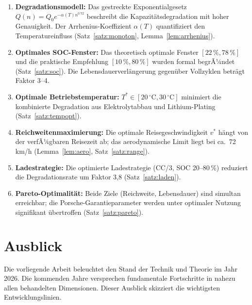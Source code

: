 ﻿\documentclass[a4paper,12pt]{article}
\theoremstyle{definition}
\begin{document}
\begin{enumerate}
  \item \textbf{Degradationsmodell:} Das gestreckte Exponentialgesetz
    $Q(n) = Q_0 e^{-\alpha(T) n^{0.72}}$ beschreibt die Kapazit\"atsdegradation
    mit hoher Genauigkeit. Der Arrhenius-Koeffizient $\alpha(T)$ quantifiziert
    den Temperatureinfluss (Satz~\ref{satz:monoton}, Lemma~\ref{lem:arrhenius}).

  \item \textbf{Optimales SOC-Fenster:} Das theoretisch optimale Fenster
    $[22\,\%, 78\,\%]$ und die praktische Empfehlung $[10\,\%, 80\,\%]$ wurden
    formal begrÃ¼ndet (Satz~\ref{satz:soc}). Die Lebensdauerverl\"angerung
    gegen\"uber Vollzyklen betr\"agt Faktor 3--4.

  \item \textbf{Optimale Betriebstemperatur:} $T^* \in [20\,^{\circ}\mathrm{C}, 30\,^{\circ}\mathrm{C}]$
    minimiert die kombinierte Degradation aus Elektrolytabbau und Lithium-Plating
    (Satz~\ref{satz:tempopt}).

  \item \textbf{Reichweitenmaximierung:} Die optimale Reisegeschwindigkeit
    $v^*$ h\"angt von der verfÃ¼gbaren Reisezeit ab; das aerodynamische Limit
    liegt bei ca.\ 72\,km/h (Lemma~\ref{lem:aero}, Satz~\ref{satz:range}).

  \item \textbf{Ladestrategie:} Die optimierte Ladestrategie (CC/3, SOC 20--80\,\%)
    reduziert die Degradationsrate um Faktor 3{,}8 (Satz~\ref{satz:laden}).

  \item \textbf{Pareto-Optimalit\"at:} Beide Ziele (Reichweite, Lebensdauer)
    sind simultan erreichbar; die Porsche-Garantieparameter werden unter
    optimaler Nutzung signifikant \"ubertroffen (Satz~\ref{satz:pareto}).
\end{enumerate}

\section{Ausblick}

Die vorliegende Arbeit beleuchtet den Stand der Technik und Theorie im Jahr 2026.
Die kommenden Jahre versprechen fundamentale Fortschritte in nahezu allen
behandelten Dimensionen. Dieser Ausblick skizziert die wichtigsten
Entwicklungslinien.
\end{document}
